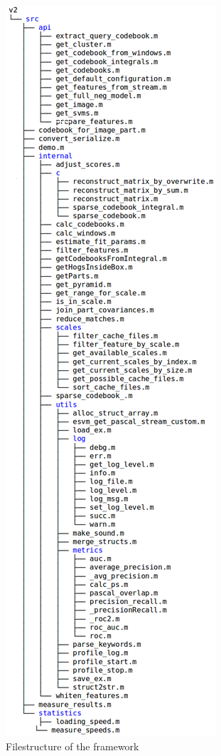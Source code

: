 \begin{figure}
\includegraphics[width=\textwidth]{content/pictures/v2_full}
\caption{Filestructure of the framework}
\label{fig:v2_full}
\end{figure}

